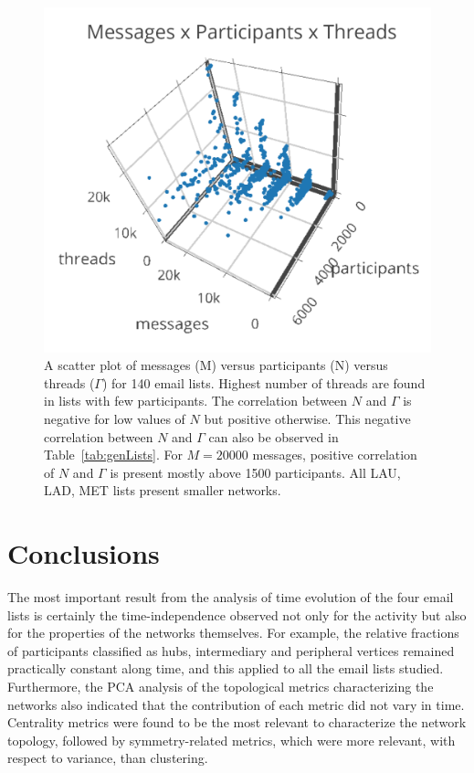 \documentclass[%
	aip,
	jmp,%
	amsmath,amssymb,
	reprint,%
]{revtex4-1}
\begin{document}
\begin{figure}
   \centering
        \includegraphics[width=\columnwidth]{figs/mpgamma____________}
	\caption{A scatter plot of messages (M) versus participants (N) versus threads ($\Gamma$) for 140 email lists. Highest number of threads are found in lists with few participants. The correlation between $N$ and $\Gamma$ is negative for low values of $N$ but positive otherwise. This negative correlation between $N$ and $\Gamma$ can also be observed in Table~\ref{tab:genLists}. For $M=20000$ messages, positive correlation of $N$ and $\Gamma$ is present mostly above 1500 participants. All LAU, LAD, MET lists present smaller networks.}
	\label{fig:nmgamma3d}
\end{figure}



\section{Conclusions}\label{sec:conc}
The most important result from the analysis of time evolution of the four email lists is certainly the time-independence observed not only for the activity but also for the properties of the networks themselves.
For example, the relative fractions of participants classified as hubs, intermediary and peripheral vertices remained practically constant along time, and this applied to all the email lists studied.
Furthermore, the PCA analysis of the topological metrics characterizing the networks also indicated that the contribution of each metric did not vary in time.
Centrality metrics were found to be the most relevant to characterize the network topology, followed by symmetry-related metrics, which were more relevant, with respect to variance, than clustering. 
\end{document}
